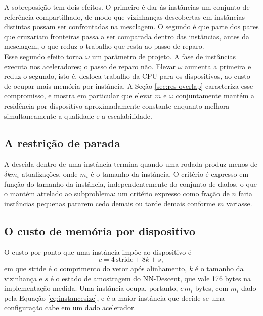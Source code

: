 A sobreposição tem dois efeitos. O primeiro é dar às instâncias um conjunto de referência compartilhado, de modo que vizinhanças descobertas em instâncias distintas possam ser confrontadas na mesclagem. O segundo é que parte dos pares que cruzariam fronteiras passa a ser comparada dentro das instâncias, antes da mesclagem, o que reduz o trabalho que resta ao passo de reparo.\\

Esse segundo efeito torna $\omega$ um parâmetro de projeto. A fase de instâncias executa nos aceleradores; o passo de reparo não. Elevar $\omega$ aumenta a primeira e reduz o segundo, isto é, desloca trabalho da \ac{CPU} para os dispositivos, ao custo de ocupar mais memória por instância. A Seção \ref{sec:res-overlap} caracteriza esse compromisso, e mostra em particular que elevar $m$ e $\omega$ conjuntamente mantém a residência por dispositivo aproximadamente constante enquanto melhora simultaneamente a qualidade e a escalabilidade.\\

\subsection{A restrição de parada\label{sec:constraints}}

A descida dentro de uma instância termina quando uma rodada produz menos de $\delta k m_i$ atualizações, onde $m_i$ é o tamanho da instância. O critério é expresso em função do tamanho da instância, independentemente do conjunto de dados, o que o mantém atrelado ao subproblema: um critério expresso como fração de $n$ faria instâncias pequenas pararem cedo demais ou tarde demais conforme $m$ variasse.\\

\subsection{O custo de memória por dispositivo\label{sec:devicecost}}

O custo por ponto que uma instância impõe ao dispositivo é
\begin{equation}
\label{eq:devicecost}
c = 4\,\mathrm{stride} + 8k + s,
\end{equation}
em que $\mathrm{stride}$ é o comprimento do vetor após alinhamento, $k$ é o tamanho da vizinhança e $s$ é o estado de amostragem do NN-Descent, que vale 176 bytes na implementação medida. Uma instância ocupa, portanto, $c\,m_i$ bytes, com $m_i$ dado pela Equação \eqref{eq:instancesize}, e é a maior instância que decide se uma configuração cabe em um dado acelerador.\\

